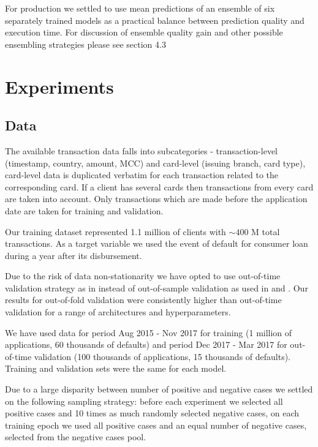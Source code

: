 \documentclass{sigkddExp}
\begin{document}
For production we settled to use mean predictions of an ensemble of six separately trained models as a practical balance between prediction quality and execution time. For discussion of ensemble quality gain and other possible ensembling strategies please see section 4.3

\section{Experiments} \label{sec-exp}
\subsection{Data} \label{sec-data}

The available transaction data falls into subcategories - transaction-level (timestamp, country, amount, MCC) and card-level (issuing branch, card type), card-level data is duplicated verbatim for each transaction related to the corresponding card. If a client has several cards then transactions from every card are taken into account. Only transactions which are made before the application date are taken for training and validation.

Our training dataset represented 1.1 million of clients with $\sim400$ M total transactions. As a target variable we used the event of default for consumer loan during a year after its disbursement.

Due to the risk of data non-stationarity we have opted to use out-of-time validation strategy as in \cite{KVAMME2018207} instead of out-of-sample validation as used in \cite{khandani2010consumer} and \cite{bellotti2013forecasting}. Our results for out-of-fold validation were consistently higher than out-of-time validation for a range of architectures and hyperparameters.

We have used data for period Aug 2015 - Nov 2017 for training  (1 million of applications, 60 thousands of defaults) and period Dec 2017 - Mar 2017 for out-of-time validation (100 thousands of applications, 15 thousands of defaults). Training and validation sets were the same for each model.

Due to a large disparity between number of positive and negative cases we settled on the following sampling strategy: before each experiment we selected all positive cases and 10 times as much randomly selected negative cases, on each training epoch we used all positive cases and an equal number of negative cases, selected from the negative cases pool.
\end{document}
